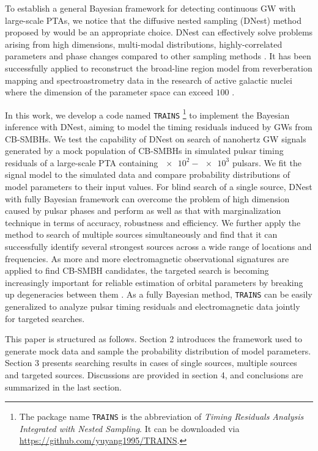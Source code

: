\documentclass[times,tight]{aastex631}
\begin{document}
To establish a general Bayesian framework for detecting continuous GW with large-scale PTAs, we notice that the diffusive nested sampling (DNest) method proposed by \cite{brewer2011} would be an appropriate choice.
DNest can effectively solve problems arising from high dimensions, multi-modal distributions, highly-correlated parameters and phase changes compared to other sampling methods \citep{brewer2018}.
It has been successfully applied to reconstruct the broad-line region model from reverberation mapping and spectroastrometry data in the research of active galactic nuclei where the dimension of the parameter space can exceed $100$ \citep[e.g.][]{pancoast2014, li2018, wang2020}.

In this work, we develop a code named \texttt{TRAINS}
\footnote{The package name \texttt{TRAINS} is the abbreviation of \emph{Timing Residuals Analysis Integrated with Nested Sampling}.
It can be downloaded via \url{https://github.com/yuyang1995/TRAINS}.}
\citep{songsheng2021} to implement the Bayesian inference with DNest, aiming to model the timing residuals induced by GWs from CB-SMBHs.
We test the capability of DNest on search of nanohertz GW signals generated by a mock population of CB-SMBHs in simulated pulsar timing residuals of a large-scale PTA containing $\num{e2}-\num{e3}$ pulsars.
We fit the signal model to the simulated data and compare probability distributions of model parameters to their input values.
For blind search of a single source, DNest with fully Bayesian framework can overcome the problem of high dimension caused by pulsar phases and perform as well as that with marginalization technique in terms of accuracy, robustness and efficiency.
We further apply the method to search of multiple sources simultaneously and find that it can successfully identify several strongest sources across a wide range of locations and frequencies.
As more and more electromagnetic observational signatures are applied to find CB-SMBH candidates, the targeted search is becoming increasingly important for reliable estimation of orbital parameters by breaking up degeneracies between them \citep{wang2020b}.
As a fully Bayesian method, \texttt{TRAINS} can be easily generalized to analyze pulsar timing residuals and electromagnetic data jointly for targeted searches.

This paper is structured as follows. 
Section 2 introduces the framework used to generate mock data and sample the probability distribution of model parameters.
Section 3 presents searching results in cases of single sources, multiple sources and targeted sources. 
Discussions are provided in section 4, and conclusions are summarized in the last section.
\end{document}
